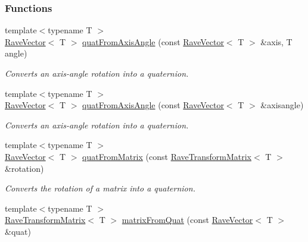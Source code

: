 \subsubsection*{Functions}
\begin{DoxyCompactItemize}
\item 
{\footnotesize template$<$typename T $>$ }\\\hyperlink{classOpenRAVE_1_1geometry_1_1RaveVector}{RaveVector}$<$ T $>$ \hyperlink{group__affine__math_ga8a5d9ee6c215ae740e449a8310e4e9d4}{quatFromAxisAngle} (const \hyperlink{classOpenRAVE_1_1geometry_1_1RaveVector}{RaveVector}$<$ T $>$ \&axis, T angle)
\begin{DoxyCompactList}\small\item\em Converts an axis-\/angle rotation into a quaternion. \item\end{DoxyCompactList}\item 
{\footnotesize template$<$typename T $>$ }\\\hyperlink{classOpenRAVE_1_1geometry_1_1RaveVector}{RaveVector}$<$ T $>$ \hyperlink{group__affine__math_gacf8a968523673f5e3e3c08ffafd75a84}{quatFromAxisAngle} (const \hyperlink{classOpenRAVE_1_1geometry_1_1RaveVector}{RaveVector}$<$ T $>$ \&axisangle)
\begin{DoxyCompactList}\small\item\em Converts an axis-\/angle rotation into a quaternion. \item\end{DoxyCompactList}\item 
{\footnotesize template$<$typename T $>$ }\\\hyperlink{classOpenRAVE_1_1geometry_1_1RaveVector}{RaveVector}$<$ T $>$ \hyperlink{group__affine__math_gad512ee3ebabb8c45bea16c84ca9ea9d4}{quatFromMatrix} (const \hyperlink{classOpenRAVE_1_1geometry_1_1RaveTransformMatrix}{RaveTransformMatrix}$<$ T $>$ \&rotation)
\begin{DoxyCompactList}\small\item\em Converts the rotation of a matrix into a quaternion. \item\end{DoxyCompactList}\item 
{\footnotesize template$<$typename T $>$ }\\\hyperlink{classOpenRAVE_1_1geometry_1_1RaveTransformMatrix}{RaveTransformMatrix}$<$ T $>$ \hyperlink{group__affine__math_gadee9ddfd3bb8c56e599cf252853ff144}{matrixFromQuat} (const \hyperlink{classOpenRAVE_1_1geometry_1_1RaveVector}{RaveVector}$<$ T $>$ \&quat)

\end{DoxyCompactItemize}
